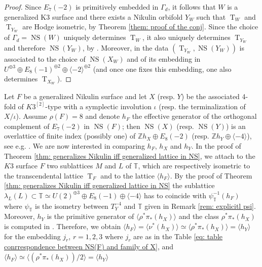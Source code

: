 \documentclass{amsart}
\theoremstyle{definition}
\numberwithin{equation}{section}
\numberwithin{equation}{section} \theoremstyle{definition}
\DeclareMathOperator{\NS}{NS}
\DeclareMathOperator{\T}{T}
\newcommand\Z{\mathbb{Z}}
\begin{document}
\begin{proof} Since $E_7(-2)$ is primitively embedded in $\Gamma_d$, it follows that $W$ is a generalized K3 surface and there exists a Nikulin orbifold $Y_W$ such that $\T_W$ and $\T_{Y_W}$ are Hodge isometric, by Theorem \ref{them: proof of the conj}. Since the choice of $\Gamma_d=\NS(W)$ uniquely determines $\T_W$, it also uniquely determines $\T_{Y_W}$ and therefore $\NS(Y_W)$, by \cite[Table 3]{CGKK}. Moreover, in \cite[Table 3]{CGKK} the data $(\T_{Y_W}, \NS(Y_W))$ is associated to the choice of $\NS(X_W)$ and of its embedding in $U^{\oplus 3}\oplus E_8(-1)^{\oplus 2}\oplus \langle -2\rangle^{\oplus 2}$ (and once one fixes this embedding, one also determines $\T_{X_W}$).\end{proof}


Let $F$ be a generalized Nikulin surface and let $X$ (resp. $Y$) be the associated  4-fold of $K3^{[2]}$-type with a symplectic involution $\iota$ (resp. the terminalization of $X/\iota$). Assume $\rho(F)=8$ and denote $h_F$ the effective generator of the orthogonal complement of $E_7(-2)$ in $\NS(F)$; then $\NS(X)$ (resp. $\NS(Y)$) is an overlattice of finite  index (possibly one) of $\Z h_X\oplus  E_8(-2)$ (resp. $\Z h_Y\oplus \langle -4\rangle$), see e.g. \cite{CGKK}. We are now interested in comparing $h_F$, $h_X$ and $h_Y$. In the proof of Theorem \ref{thm: generalizes Nikulin iff generalized lattice in NS}, we attach to the $K3$ surface $F$ two sublattices $M$ and $L$ of $\mathbb{T}$, which are respectively isometric to the transcendental lattice $\T_F$ and to the lattice $\langle h_F\rangle$. By the proof of Theorem \ref{thm: generalizes Nikulin iff generalized lattice in NS} the sublattice $\lambda_L(L)\subset \mathbb{T}\simeq U(2)^{\oplus 3}\oplus E_8(-1)\oplus \langle -4\rangle$ has to coincide with  $\psi_{\mathbb{T}}^{-1}(h_F)$ where $\psi_{\mathbb{T}}$ is the isometry between $T_Y^{ -4}$ and $\mathbb{T}$ given in Remark \ref{rem: explicitl psi}. Moreover, $h_Y$ is the primitive generator of $\langle \rho^*\pi_*(h_X)\rangle$ and the class $\rho^*\pi_*(h_X)$ is computed in \cite[Proposition 3.5, 3.6, 3.7, 3.8]{CGKK}. Therefore, we obtain $\langle h_F\rangle=\langle\nu^*(h_X)\rangle \simeq \langle\rho^*\pi_*(h_X)\rangle=\langle h_Y\rangle$ for the embedding $j_r$, $r=1,2,3$ where $j_r$ are as in the Table \ref{eq: table conrrespondence between NS(F) and family of X}, and $\langle h_F\rangle \simeq \langle (\rho^*\pi_*(h_X))/2\rangle=\langle h_Y\rangle$ %
\end{document}
